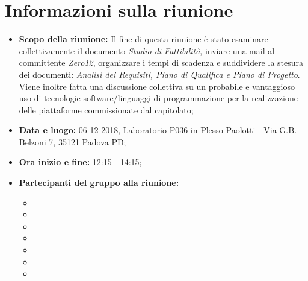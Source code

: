 \clearpage
\section{Informazioni sulla riunione}
\begin{itemize}
	\item \textbf {Scopo della riunione:} Il fine di questa riunione è stato esaminare collettivamente il documento \emph{Studio di Fattibilità}, inviare una mail al committente \emph{Zero12}, organizzare i tempi di scadenza e suddividere la stesura dei documenti: \emph{Analisi dei Requisiti, Piano di Qualifica e Piano di Progetto}. \\
	Viene inoltre fatta una discussione collettiva su un probabile e vantaggioso uso di tecnologie software/linguaggi di programmazione per la realizzazione delle piattaforme commissionate dal capitolato;
	
	\item \textbf {Data e luogo:} 06-12-2018, Laboratorio P036 in Plesso Paolotti - Via G.B. Belzoni 7, 35121 Padova PD;
	
	\item \textbf {Ora inizio e fine:} 12:15 - 14:15;
	
	\item \textbf {Partecipanti del gruppo alla riunione:} 
		 \begin{itemize}
			\item \sonia
			\item \luca
			\item \matteo
			\item \pardeep
			\item \alberto
			\item \alessandro
			\item \andrea
		\end{itemize}
\end{itemize}